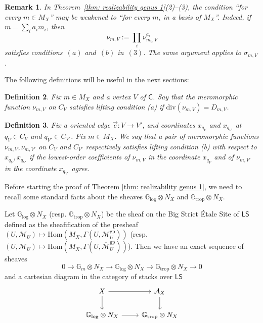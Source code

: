 \documentclass{article}
\newtheorem{definition}{Definition}[section]
\newtheorem{remark}[definition]{Remark}
\def\log{\mathrm{log}}
\begin{document}
\begin{remark} \label{rem: basis}
In Theorem~\ref{thm: realizability genus 1}(2)--(3), the condition ``for every \(m \in M_X\)'' may be weakened to ``for every \(m_i\) in a basis of \(M_X\)''. Indeed, if \(m = \sum_i a_i m_i\), then
\[
\nu_{m,V} := \prod_i \nu_{m_i,V}^{a_i}
\]
satisfies conditions~\((a)\) and~\((b)\) in~\((3)\). The same argument applies to \(\sigma_{m,V}\).
\end{remark}

The following definitions will be useful in the next sections:

\begin{definition} \label{def: lifting condition a}
    Fix $m \in M_X$ and a vertex $V$ of $\mathsf{C}$. Say that the meromorphic function $\nu_{m,V}$ on $C_V$ satisfies lifting condition (a) if $\mathrm{div}(\nu_{m,V}) = D_{m,V}$. 
\end{definition}


\begin{definition} \label{def: lifting condition b}
    Fix a oriented edge $\vec{e}:V \to V'$, and coordinates $x_{q_V}$ and $x_{q_{V'}}$ at $q_V \in C_V$ and $q_{V'} \in C_{V'}$. Fix $m \in M_X$. We say that a pair of meromorphic functions $\nu_{m,V}, \nu_{m, V'}$ on $C_V$ and $C_{V'}$ respectively satisfies lifting condition (b) with respect to $x_{q_V}, x_{q_{V'}}$ if the lowest-order coefficients of $\nu_{m,V}$ in the coordinate $x_{q_V}$ and of $\nu_{m,V'}$ in the coordinate $x_{q_{V'}}$ agree. 
\end{definition}



Before starting the proof of Theorem \ref{thm: realizability genus 1},  we need to recall some standard facts about the sheaves $\mathbb{G}_{\log}\otimes N_X$ and $\mathbb{G}_{\mathrm{trop}}\otimes N_X$. 

Let $\mathbb{G}_{\log} \otimes N_X$ (resp. $\mathbb{G}_{\mathrm{trop}} \otimes N_X$) be the sheaf on the Big Strict Étale Site of $\mathsf{LS}$ defined as the sheafification of the presheaf $(U,\mathcal{M}_U) \mapsto \mathrm{Hom}(M_X,\Gamma(U,\mathcal{M}_U^{\mathrm{gp}}))$ (resp. $(U,\mathcal{M}_U) \mapsto \mathrm{Hom}(M_X,\Gamma(U,\overline{\mathcal{M}}_U^{\mathrm{gp}}))$). Then we have an exact sequence of sheaves
$$0 \to \mathbb{G}_m\otimes N_X \to \mathbb{G}_{\mathrm{log}}\otimes N_X \to \mathbb{G}_{\mathrm{trop}}\otimes N_X \to 0$$
and a cartesian diagram in the category of stacks over $\mathsf{LS}$
\begin{equation}\label{eqn: cartesian square Glog}
\begin{tikzcd}
X \arrow[r] \arrow[d] & \mathcal{A}_{X} \arrow[d] \\
\mathbb{G}_{\mathrm{log}} \otimes N_X \arrow[r] & \mathbb{G}_{\mathrm{trop}} \otimes N_X
\end{tikzcd}
\end{equation}
\end{document}
